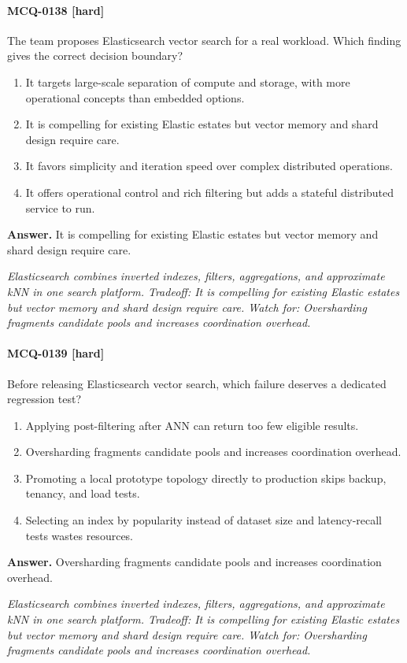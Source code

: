 \paragraph{MCQ-0138 [hard]} The team proposes Elasticsearch vector search for a real workload. Which finding gives the correct decision boundary?
\begin{enumerate}[label=\Alph*.]
\item It targets large-scale separation of compute and storage, with more operational concepts than embedded options.
\item It is compelling for existing Elastic estates but vector memory and shard design require care.
\item It favors simplicity and iteration speed over complex distributed operations.
\item It offers operational control and rich filtering but adds a stateful distributed service to run.
\end{enumerate}
\noindent\textbf{Answer.} It is compelling for existing Elastic estates but vector memory and shard design require care.
\par\textit{Elasticsearch combines inverted indexes, filters, aggregations, and approximate kNN in one search platform. Tradeoff: It is compelling for existing Elastic estates but vector memory and shard design require care. Watch for: Oversharding fragments candidate pools and increases coordination overhead.}
\paragraph{MCQ-0139 [hard]} Before releasing Elasticsearch vector search, which failure deserves a dedicated regression test?
\begin{enumerate}[label=\Alph*.]
\item Applying post-filtering after ANN can return too few eligible results.
\item Oversharding fragments candidate pools and increases coordination overhead.
\item Promoting a local prototype topology directly to production skips backup, tenancy, and load tests.
\item Selecting an index by popularity instead of dataset size and latency-recall tests wastes resources.
\end{enumerate}
\noindent\textbf{Answer.} Oversharding fragments candidate pools and increases coordination overhead.
\par\textit{Elasticsearch combines inverted indexes, filters, aggregations, and approximate kNN in one search platform. Tradeoff: It is compelling for existing Elastic estates but vector memory and shard design require care. Watch for: Oversharding fragments candidate pools and increases coordination overhead.}
